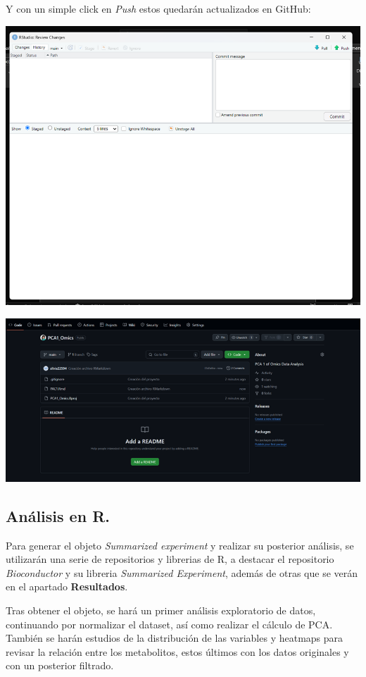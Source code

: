 \documentclass[
]{article}
\begin{document}
Y con un simple click en \emph{Push} estos quedarán actualizados en
GitHub:

\includegraphics{images/clipboard-2370911352.png}

\includegraphics{images/clipboard-2395957737.png}

\subsection{Análisis en R.}\label{anuxe1lisis-en-r.}

Para generar el objeto \emph{Summarized experiment} y realizar su
posterior análisis, se utilizarán una serie de repositorios y librerias
de R, a destacar el repositorio \emph{Bioconductor} y su libreria
\emph{Summarized Experiment}, además de otras que se verán en el
apartado \textbf{Resultados}.

Tras obtener el objeto, se hará un primer análisis exploratorio de
datos, continuando por normalizar el dataset, así como realizar el
cálculo de PCA. También se harán estudios de la distribución de las
variables y heatmaps para revisar la relación entre los metabolitos,
estos últimos con los datos originales y con un posterior filtrado.
\end{document}
